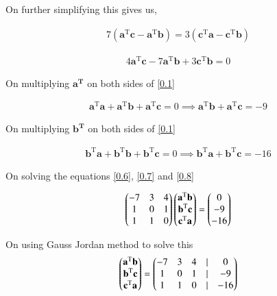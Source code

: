\documentclass{beamer}
\begin{document}
\begin{frame}
On further simplifying this gives us,

\begin{align}
    7(\textbf{a}^{\text{T}}\textbf{c}-\textbf{a}^{\text{T}}\textbf{b})=3(\textbf{c}^{\text{T}}\textbf{a}-\textbf{c}^{\text{T}}\textbf{b})
    \label{0.5}
\end{align}

\begin{align}
    4\textbf{a}^{\text{T}}\textbf{c}-7\textbf{a}^{\text{T}}\textbf{b}+3\textbf{c}^{\text{T}}\textbf{b}=0
    \label{0.6}
\end{align}

\end{frame}
\begin{frame}

On multiplying $\textbf{a}^{\textbf{T}}$ on both sides of \ref{0.1}

\begin{align}
    \textbf{a}^{\text{T}}\textbf{a}+\textbf{a}^{\text{T}}\textbf{b}+\textbf{a}^{\text{T}}\textbf{c}=0 \implies \textbf{a}^{\text{T}}\textbf{b}+\textbf{a}^{\text{T}}\textbf{c}=-9
    \label{0.7}
\end{align}

On multiplying $\textbf{b}^{\textbf{T}}$ on both sides of \ref{0.1}

\begin{align}
    \textbf{b}^{\text{T}}\textbf{a}+\textbf{b}^{\text{T}}\textbf{b}+\textbf{b}^{\text{T}}\textbf{c}=0 \implies \textbf{b}^{\text{T}}\textbf{a}+\textbf{b}^{\text{T}}\textbf{c}=-16
    \label{0.8}
\end{align}

\end{frame}
\begin{frame}
On solving the equations \ref{0.6}, \ref{0.7} and \ref{0.8}

\begin{align}
    \begin{pmatrix}-7 & 3 & 4 \\ 1 & 0 & 1\\1 & 1 & 0\end{pmatrix} \begin{pmatrix}\textbf{a}^\text{T}\textbf{b}\\\textbf{b}^\text{T}\textbf{c}\\\textbf{c}^\text{T}\textbf{a}\\\end{pmatrix}=\begin{pmatrix}0\\-9\\-16\end{pmatrix}
    \label{0.9}
\end{align}

On using Gauss Jordan method to solve this
\begin{align}
    \begin{pmatrix}\textbf{a}^\text{T}\textbf{b}\\\textbf{b}^\text{T}\textbf{c}\\\textbf{c}^\text{T}\textbf{a}\\\end{pmatrix}=\begin{pmatrix}-7 & 3 & 4 &| & 0\\1& 0 & 1 & | &-9\\1&1&0&|&-16\end{pmatrix}
    \label{0.10}
\end{align}

\end{frame}
\end{document}
